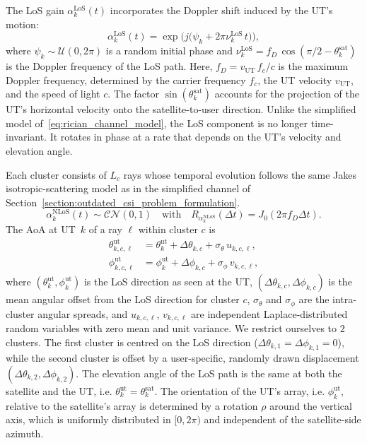 The \ac{LoS} gain $\alpha_k^{\mathrm{LoS}}(t)$ incorporates the Doppler shift induced by the \ac{UT}'s motion:
\begin{equation}
\label{eq:los_gain}
    \alpha_k^{\mathrm{LoS}}(t) = \exp\bigl(j\bigl(\psi_k + 2\pi\nu_k^{\mathrm{LoS}}\,t\bigr)\bigr),
\end{equation}
where $\psi_k \sim \mathcal{U}(0, 2\pi)$ is a random initial phase and $\nu_k^{\mathrm{LoS}} = f_D \, \cos(\pi/2 - \theta^{\mathrm{sat}}_k)$ is the Doppler frequency of the \ac{LoS} path.
Here, $f_D = v_{\mathrm{UT}} \, f_c / c$ is the maximum Doppler frequency, determined by the carrier frequency $f_c$, the \ac{UT} velocity $v_{\mathrm{UT}}$, and the speed of light $c$.
The factor $\sin(\theta^{\mathrm{sat}}_k)$ accounts for the projection of the \ac{UT}'s horizontal velocity onto the satellite-to-user direction.
Unlike the simplified model of~\eqref{eq:rician_channel_model}, the \ac{LoS} component is no longer time-invariant. It rotates in phase at a rate that depends on the \ac{UT}'s velocity and elevation angle.

Each cluster consists of $L_c$ rays whose temporal evolution follows the same Jakes isotropic-scattering model as in the simplified channel of
Section~\ref{section:outdated_csi_problem_formulation}.
\begin{equation}
\label{eq:nlos_gain}
    \alpha_k^{\mathrm{NLoS}}(t) \sim \mathcal{CN}(0, 1) \quad \text{with} \quad R_{\alpha_k^{\mathrm{NLoS}}}(\Delta t) = J_0(2\pi f_D \Delta t).
\end{equation}
The \ac{AoA} at \ac{UT}~$k$ of a ray $\ell$ within cluster $c$ is
\begin{align}
    \theta^{\mathrm{ut}}_{k,c,\ell} &= \theta^{\mathrm{ut}}_k + \Delta\theta_{k,c} + \sigma_\theta\, u_{k,c,\ell},
    \label{eq:nlos_elevation_angles}\\
    \phi^{\mathrm{ut}}_{k,c,\ell} &= \phi^{\mathrm{ut}}_k + \Delta\phi_{k,c} + \sigma_\phi\, v_{k,c,\ell},
    \label{eq:nlos_azimuth_angles}
\end{align}
where $(\theta^{\mathrm{ut}}_k, \phi^{\mathrm{ut}}_k)$ is the \ac{LoS} direction as seen at the \ac{UT}, $(\Delta\theta_{k,c}, \Delta\phi_{k,c})$ is the mean angular offset from the \ac{LoS} direction for cluster $c$, $\sigma_\theta$ and $\sigma_\phi$ are the intra-cluster angular spreads, and $u_{k,c,\ell}$, $v_{k,c,\ell}$ are independent Laplace-distributed random variables with zero mean and unit variance.
We restrict ourselves to $2$ clusters.
The first cluster is centred on the \ac{LoS} direction ($\Delta\theta_{k,1} = \Delta\phi_{k,1} = 0$), while the second cluster is offset by a user-specific, randomly drawn displacement $(\Delta\theta_{k,2}, \Delta\phi_{k,2})$.
The elevation angle of the \ac{LoS} path is the same at both the satellite and the \ac{UT}, i.e. $\theta^{\mathrm{ut}}_k = \theta^{\mathrm{sat}}_k$.
The orientation of the \ac{UT}'s array, i.e. $\phi^{\mathrm{ut}}_k$, relative to the satellite's array is determined by a rotation $\rho$ around the vertical axis, which is uniformly distributed in $[0, 2\pi)$ and independent of the satellite-side azimuth.
\medskip

